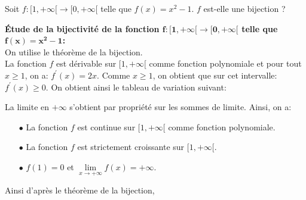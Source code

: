 \documentclass[a4paper, 11pt,reqno]{article}
\begin{document}
\begin{exercice}  \;
	Soit $f: \lbrack 1,+\infty\lbrack\rightarrow \lbrack 0,+\infty\lbrack$ telle que $f(x)=x^2-1$. $f$ est-elle une bijection ?
\end{exercice}
\begin{correction} \;
	\textbf{\'Etude de la bijectivit\'e de la fonction $\mathbf{f: \lbrack 1,+\infty\lbrack\rightarrow \lbrack 0,+\infty\lbrack}$ telle que $\mathbf{f(x)=x^2-1}$:}\\
	\noindent On utilise le th\'eor\`{e}me de la bijection.\\
	\noindent La fonction $f$ est d\'erivable sur $\lbrack 1,+\infty\lbrack$ comme fonction polynomiale et pour tout $x\geq 1$, on a: $f^{\prime}(x)=2x$. Comme $x\geq 1$, on obtient que sur cet intervalle: $f^{\prime}(x)\geq 0$. On obtient ainsi le tableau de variation suivant:
	\begin{center}
	\end{center}
	La limite en $+\infty$ s'obtient par propri\'et\'e sur les sommes de limite. Ainsi, on a:
	\begin{itemize}
		\item[$\bullet$] La fonction $f$ est continue sur $\lbrack 1,+\infty\lbrack$ comme fonction polynomiale.
		\item[$\bullet$] La fonction $f$ est strictement croissante sur $\lbrack 1,+\infty\lbrack$.
		\item[$\bullet$] $f(1)=0$ et $\lim\limits_{x\to +\infty} f(x)=+\infty$.
	\end{itemize}
	Ainsi d'apr\`{e}s le th\'eor\`{e}me de la bijection, 
\end{correction}
\end{document}

